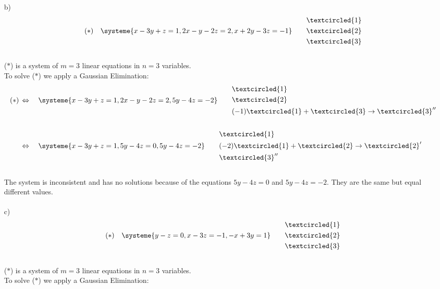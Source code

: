 \documentclass{jhwhw}
\begin{document}
b) \begin{align*} 
(\ast) \quad \systeme{x-3y+z=1, 2x-y-2z=2, x+2y-3z=-1} \quad \quad \begin{aligned} &\textcircled{1} \\ &\textcircled{2} \\ &\textcircled{3}\end{aligned}
\end{align*}
\\
(\(\ast\)) is a system of \(m=3\) linear equations in \(n=3\) variables. 
\\
To solve (\(\ast\)) we apply a Gaussian Elimination:
\\

\begin{align*} 
(\ast) \, &\Leftrightarrow \quad \systeme{x-3y+z=1, 2x-y-2z=2, 5y-4z=-2} \quad \quad \begin{aligned} &\textcircled{1} \\ &\textcircled{2} \\ &(-1)\textcircled{1}+\textcircled{3} \rightarrow \textcircled{3}''\end{aligned}
\\ \\ 
&\Leftrightarrow \quad \systeme{x-3y+z=1, 5y-4z=0, 5y-4z=-2} \quad \quad \begin{aligned} &\textcircled{1} \\ &(-2)\textcircled{1}+\textcircled{2} \rightarrow \textcircled{2}' \\ &\textcircled{3}''\end{aligned}
\end{align*}
\\
The system is inconsistent and has no solutions because of the equations \(5y-4z=0\) and \(5y-4z=-2\). They are the same but equal different values.
\\ \\

c) \begin{align*} 
(\ast) \quad \systeme{y-z=0, x-3z=-1, -x+3y=1} \quad \quad \begin{aligned} &\textcircled{1} \\ &\textcircled{2} \\ &\textcircled{3}\end{aligned}
\end{align*}
\\
(\(\ast\)) is a system of \(m=3\) linear equations in \(n=3\) variables. 
\\
To solve (\(\ast\)) we apply a Gaussian Elimination:
\\
\end{document}
